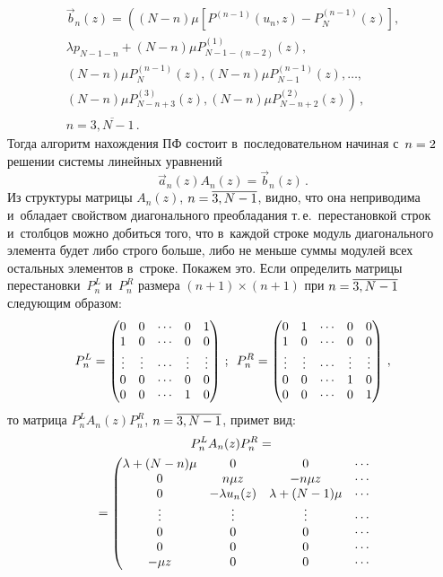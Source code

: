 \begin{multicols}{2}
\noindent
\begin{multline*}
\vec{b}_n(z) = \left (
(N-n) \mu
[P^{(n-1)}(u_n,z) - P^{(n-1)}_{N}(z)],\right.
\\
\lambda p_{N-1-n}+ (N-n) \mu P^{(1)}_{N-1-(n-2)}(z),\\
(N-n) \mu P^{(n-1)}_{N}(z), (N-n)\mu  P^{(n-1)}_{N-1}(z),
\dots ,
\\
\left.
(N-n)\mu  P^{(3)}_{N-n+3}(z), (N-n)\mu  P^{(2)}_{N-n+2}(z)
\right )\,,\\
n =\overline{3,N-1}\,.
\end{multline*}
Тогда алгоритм нахождения ПФ состоит в~последовательном начиная с~$n\hm=2$ решении
системы линейных уравнений
$$
\vec{a}_n(z) A_n(z) = \vec{b}_n(z) \,.
$$
Из структуры матрицы $A_n(z)$, $n \hm=\overline{3,N-1}$, видно, что
она неприводима и~обладает свойством диагонального преобладания
т.\,е.\ перестановкой строк и~столбцов можно добиться того,
что в~каждой строке модуль диагонального элемента будет либо строго
больше, либо не меньше суммы модулей всех остальных элементов в~строке.
Покажем это. Если определить матрицы перестановки~$P^L_n$ и~$P^R_n$
размера $(n+1)\times (n+1)$ при $n \hm=\overline{3,N-1}$
следующим образом:
\begin{gather*}
\setcounter{MaxMatrixCols}{5}
P^L_n=
\begin{pmatrix}
 0   & 0  & \cdots & 0& 1 \\
 1   & 0  & \cdots & 0& 0 \\
  \vdots   &  \vdots  & \cdots &  \vdots &  \vdots \\
  0   & 0  & \cdots & 0& 0 \\
   0   & 0  & \cdots & 1& 0
\end{pmatrix}\,;
\enskip
\setcounter{MaxMatrixCols}{5}
P^R_n=
\begin{pmatrix}
 0   & 1  & \cdots & 0& 0         \\
 1   & 0  & \cdots & 0& 0 \\
   \vdots   &  \vdots  & \cdots &  \vdots &  \vdots \\
  0   & 0  & \cdots & 1& 0 \\
   0   & 0  & \cdots & 0& 1
\end{pmatrix}\,,
\end{gather*}
то матрица $P^L_n A_n(z)P^R_n$, $n \hm=\overline{3,N-1}$,
примет вид:
\begin{multline*}
\setcounter{MaxMatrixCols}{7}
P^L_n A_n(z)P^R_n={}\\
{}=\left(
\begin{matrix}
 \lambda +(N-n)\mu &0 & 0  & \cdots\\
 0  &  n \mu z   & - n \mu z &  \cdots       \\
  0  & - \lambda u_n(z) & \lambda +(N-1) \mu  & \cdots  \\
  \vdots   & \vdots & \vdots & \cdots   \\
 0   & 0 & 0& \cdots \\
 0      & 0 & 0    & \cdots  \\
 - \mu z  & 0   &0   & \cdots
\end{matrix}\right.
\end{multline*}


\end{multicols}
